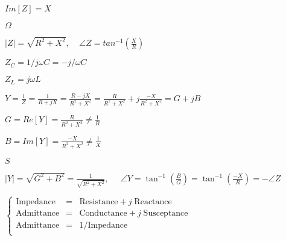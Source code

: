 \documentclass{article}
\def\lthtmlcheckvsize{\ifdim\ht\sizebox<\vsize 
  \ifdim\wd\sizebox<\hsize\expandafter\hfill\fi \expandafter\vfill
  \else\expandafter\vss\fi}%
\begin{document}
{\newpage\clearpage
{}%
$ Im[Z]=X$%
\lthtmlindisplaymathZ
\lthtmlcheckvsize\clearpage}

{\newpage\clearpage
{}%
$ \Omega$%
\lthtmlindisplaymathZ
\lthtmlcheckvsize\clearpage}

{\newpage\clearpage
{}%
$\displaystyle |Z|=\sqrt{R^2+X^2},\;\;\;\;\angle Z=tan^{-1}\left(\frac{X}{R}\right)$%
\lthtmlindisplaymathZ
\lthtmlcheckvsize\clearpage}

{\newpage\clearpage
{}%
$ Z_C=1/j\omega C=-j/\omega C$%
\lthtmlindisplaymathZ
\lthtmlcheckvsize\clearpage}

{\newpage\clearpage
{}%
$ Z_L=j\omega L$%
\lthtmlindisplaymathZ
\lthtmlcheckvsize\clearpage}

{\newpage\clearpage
{}%
$\displaystyle Y=\frac{1}{Z}=\frac{1}{R+jX}=\frac{R-jX}{R^2+X^2}
=\frac{R}{R^2+X^2}+j\frac{-X}{R^2+X^2}=G+jB$%
\lthtmlindisplaymathZ
\lthtmlcheckvsize\clearpage}

{\newpage\clearpage
{}%
$\displaystyle G=Re[Y]=\frac{R}{R^2+X^2}	\ne \frac{1}{R}$%
\lthtmlindisplaymathZ
\lthtmlcheckvsize\clearpage}

{\newpage\clearpage
{}%
$\displaystyle B=Im[Y]=\frac{-X}{R^2+X^2} \ne \frac{1}{X}$%
\lthtmlindisplaymathZ
\lthtmlcheckvsize\clearpage}

{\newpage\clearpage
{}%
$ S$%
\lthtmlindisplaymathZ
\lthtmlcheckvsize\clearpage}

{\newpage\clearpage
{}%
$\displaystyle |Y|=\sqrt{G^2+B^2}=\frac{1}{\sqrt{R^2+X^2}},\;\;\;\;\;
\angle Y=\tan^{-1} \left(\frac{B}{G}\right)=\tan^{-1} \left(\frac{-X}{R}\right)
=-\angle Z$%
\lthtmlindisplaymathZ
\lthtmlcheckvsize\clearpage}

{\newpage\clearpage
{}%
$\displaystyle \left\{\begin{array}{rcl}
\mbox{Impedance} &=& \mbox{Resistance} + j \;\mbox{Reactance} \\
\mbox{Admittance} &=& \mbox{Conductance} + j\; \mbox{Susceptance} \\
\mbox{Admittance}&=&1/\mbox{Impedance}\\
\end{array}\right.$%
\lthtmlindisplaymathZ
\lthtmlcheckvsize\clearpage}
\end{document}
